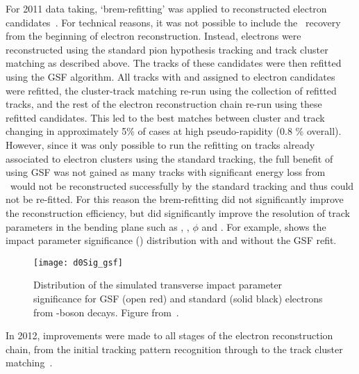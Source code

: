 For 2011 data taking, `brem-refitting' was applied to
reconstructed electron candidates~\cite{ATLAS-CONF-2012-047}. For technical reasons, it was not possible to
include the \brem\ recovery from the beginning of electron reconstruction.
Instead, electrons were reconstructed using the standard pion hypothesis
tracking and track cluster matching as described above. The tracks of these candidates were then refitted
using the GSF algorithm. All tracks with  and  assigned to
electron candidates were refitted, the cluster-track matching re-run
using the collection of refitted tracks, and the rest of the electron reconstruction
chain re-run using these refitted candidates. This led to the best matches between
cluster and track changing in approximately 5\% of cases at high pseudo-rapidity (0.8 \%
overall). However, since it was only possible to run the refitting on tracks
already associated to electron clusters using the standard tracking, the full
benefit of using GSF was not gained as many tracks with significant energy loss
from \brem\ would not be reconstructed successfully by the standard tracking and
thus could not be re-fitted. For this reason the brem-refitting did not
significantly improve the reconstruction efficiency, but did significantly
improve the resolution of track parameters in the bending plane such as \dzero, \dzerosig,
$\phi$ and \qoverp. For example,  shows the impact parameter
significance (\dzerosig) distribution with and without the GSF refit. 

\begin{figure}[h!]
\centering
            \texttt{[image: d0Sig\_gsf]}
\caption[Distribution of the simulated transverse impact parameter significance for GSF and standard electrons from \Z-boson decays. ]{Distribution of the simulated transverse impact parameter significance for GSF (open
red) and standard (solid black) electrons from \Z-boson decays. 
Figure from~\cite{ATLAS-CONF-2012-047}.}
\label{fig:d0Sig-gsf}
\end{figure}


In 2012, improvements were made to all stages of the electron reconstruction
chain, from the initial tracking pattern recognition through to the track
cluster matching~\cite{HSG2:1456228}. 

